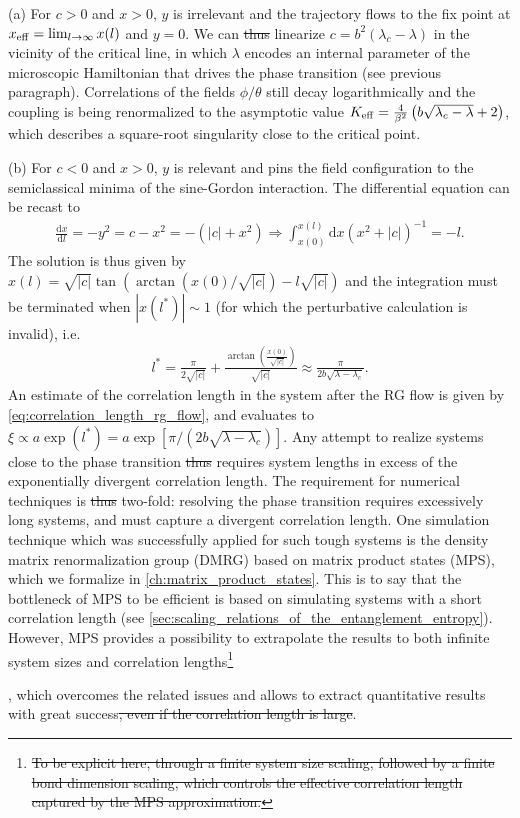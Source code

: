 \documentclass{svmono}
\def\rd{\mathrm d}
\newcommand{\brlr}[1]{\left( #1 \right)}
\providecommand{\DIFdeltex}[1]{{\protect\color{red}\sout{#1}}}                      %
\providecommand{\DIFdelbegin}{} %
\providecommand{\DIFdelend}{} %
\providecommand{\DIFdel}[1]{\texorpdfstring{\DIFdeltex{#1}}{}} %
\newcommand{\DIFscaledelfig}{0.5}
\newlength{\DIFdelgraphicswidth} %
\newlength{\DIFdelgraphicsheight} %
\newcommand{\DIFdelincludegraphics}[2][]{%
\sbox{\DIFdelgraphicsbox}{\DIFOincludegraphics[#1]{#2}}%
\settoboxwidth{\DIFdelgraphicswidth}{\DIFdelgraphicsbox} %
\settoboxtotalheight{\DIFdelgraphicsheight}{\DIFdelgraphicsbox} %
\scalebox{\DIFscaledelfig}{%
\parbox[b]{\DIFdelgraphicswidth}{\usebox{\DIFdelgraphicsbox}\\[-\baselineskip] \rule{\DIFdelgraphicswidth}{0em}}\llap{\resizebox{\DIFdelgraphicswidth}{\DIFdelgraphicsheight}{%
\setlength{\unitlength}{\DIFdelgraphicswidth}%
\begin{picture}(1,1)%
\thicklines\linethickness{2pt} %
{\color[rgb]{1,0,0}\put(0,0){\framebox(1,1){}}}%
{\color[rgb]{1,0,0}\put(0,0){\line( 1,1){1}}}%
{\color[rgb]{1,0,0}\put(0,1){\line(1,-1){1}}}%
\end{picture}%
}\hspace*{3pt}}} %
} %
\DeclareRobustCommand{\DIFdelbegin}{\DIFOdelbegin \let\includegraphics\DIFdelincludegraphics} %
\DeclareRobustCommand{\DIFdelend}{\DIFOaddend \let\includegraphics\DIFOincludegraphics} %
\begin{document}
(a) For $c>0$ and $x>0$, $y$ is irrelevant and the trajectory flows to the fix point at $x_{\rm eff} = \lim_{l\rightarrow\infty} x(l)$ and $y=0$.
We can \DIFdelbegin \DIFdel{thus }\DIFdelend linearize $c=b^2(\lambda_c-\lambda)$ in the vicinity of the critical line, in which $\lambda$ encodes an internal parameter of the microscopic Hamiltonian that drives the phase transition (see previous paragraph).
Correlations of the fields $\phi/\theta$ still decay logarithmically and the coupling is being renormalized to the asymptotic value $K_{\rm eff} = \frac4{\beta^2}\brlr{b\sqrt{\lambda_c-\lambda}+2}$, which describes a square-root singularity close to the critical point.

(b) For $c<0$ and $x>0$, $y$ is relevant and pins the field configuration to the semiclassical minima of the sine-Gordon interaction.
The differential equation can be recast to
\begin{align}
    \frac{\rd x}{\rd l} = -y^2 = c-x^2 = -(|c|+x^2)
    \Rightarrow
    \int_{x(0)}^{x(l)}\rd x(x^2+|c|)^{-1} = -l
    .
\end{align}
The solution is thus given by $x(l) = \sqrt{|c|}\tan(\arctan(x(0)/\sqrt{|c|})-l\sqrt{|c|})$ and the integration must be terminated when $|x(l^*)|\sim 1$ (for which the perturbative calculation is invalid), i.e.
\begin{align}
    l^*=\frac{\pi}{2\sqrt{|c|}}+\frac{\arctan\brlr{\frac{x(0)}{\sqrt{|c|}}}}{\sqrt{|c|}}\approx \frac{\pi}{2b\sqrt{\lambda-\lambda_c}}.
\end{align}
An estimate of the correlation length in the system after the RG flow is given by \cref{eq:correlation_length_rg_flow}, and evaluates to $\xi\propto a\exp(l^*)=a\exp[{{\pi}/({2b\sqrt{\lambda-\lambda_c}})}]$.
Any attempt to realize systems close to the phase transition \DIFdelbegin \DIFdel{thus }\DIFdelend requires system lengths in excess of the exponentially divergent correlation length.
The requirement for numerical techniques is \DIFdelbegin \DIFdel{thus }\DIFdelend two-fold: resolving the phase transition requires excessively long systems, and must capture a divergent correlation length.
One simulation technique which was successfully applied for such tough systems is the density matrix renormalization group (DMRG) based on matrix product states (MPS), which we formalize in \cref{ch:matrix_product_states}.
This is to say that the bottleneck of MPS to be efficient is based on simulating systems with a short correlation length (see \cref{sec:scaling_relations_of_the_entanglement_entropy}).
However, MPS provides a possibility to extrapolate the results to both infinite system sizes and correlation lengths\DIFdelbegin \footnote{\DIFdel{To be explicit here, through a finite system size scaling, followed by a finite bond dimension scaling, which controls the effective correlation length captured by the MPS approximation.}}%
\addtocounter{footnote}{-1}%
\DIFdelend , which overcomes the related issues and allows to extract quantitative results with great success\DIFdelbegin \DIFdel{, even if the correlation length is large}\DIFdelend .
\end{document}
